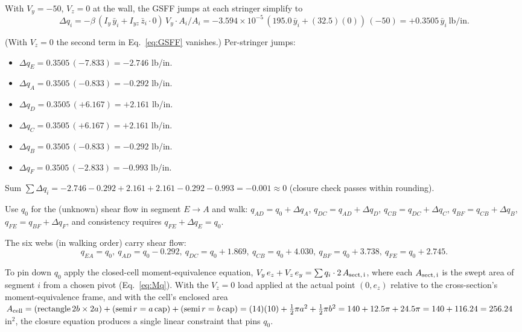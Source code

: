 \documentclass[11pt]{article}
\begin{document}
With $V_y = -50$, $V_z = 0$ at the wall, the GSFF jumps at each stringer simplify to
$$\Delta q_i = -\beta\,(I_y\,\bar y_i + I_{yz}\,\bar z_i \cdot 0)\,V_y\cdot A_i / A_i = -3.594\times 10^{-5}\,(195.0\,\bar y_i + (32.5)(0))\,(-50) = +0.3505\,\bar y_i\ \text{lb/in}.$$

(With $V_z = 0$ the second term in Eq.~\eqref{eq:GSFF} vanishes.) Per-stringer jumps:
\begin{itemize}[leftmargin=2em, itemsep=0pt]
  \item $\Delta q_E = 0.3505\,(-7.833) = -2.746$ lb/in.
  \item $\Delta q_A = 0.3505\,(-0.833) = -0.292$ lb/in.
  \item $\Delta q_D = 0.3505\,(+6.167) = +2.161$ lb/in.
  \item $\Delta q_C = 0.3505\,(+6.167) = +2.161$ lb/in.
  \item $\Delta q_B = 0.3505\,(-0.833) = -0.292$ lb/in.
  \item $\Delta q_F = 0.3505\,(-2.833) = -0.993$ lb/in.
\end{itemize}
Sum $\sum \Delta q_i = -2.746 - 0.292 + 2.161 + 2.161 - 0.292 - 0.993 = -0.001 \approx 0$ (closure check passes within rounding).

Use $q_0$ for the (unknown) shear flow in segment $E \to A$ and walk: $q_{AD} = q_0 + \Delta q_A$, $q_{DC} = q_{AD} + \Delta q_D$, $q_{CB} = q_{DC} + \Delta q_C$, $q_{BF} = q_{CB} + \Delta q_B$, $q_{FE} = q_{BF} + \Delta q_F$, and consistency requires $q_{FE} + \Delta q_E = q_0$.

The six webs (in walking order) carry shear flow:
$$q_{EA} = q_0,\ q_{AD} = q_0 - 0.292,\ q_{DC} = q_0 + 1.869,\ q_{CB} = q_0 + 4.030,\ q_{BF} = q_0 + 3.738,\ q_{FE} = q_0 + 2.745.$$

To pin down $q_0$ apply the closed-cell moment-equivalence equation, $V_y\,e_z + V_z\,e_y = \sum q_i \cdot 2\,A_{\rm sect,\,i}$, where each $A_{\rm sect,\,i}$ is the swept area of segment $i$ from a chosen pivot (Eq.~\eqref{eq:Mq}). With the $V_z = 0$ load applied at the actual point $(0, e_z)$ relative to the cross-section's moment-equivalence frame, and with the cell's enclosed area $A_{\rm cell} = (\text{rectangle}\,2b\times 2a) + (\text{semi}\,r=a\,\text{cap}) + (\text{semi}\,r=b\,\text{cap}) = (14)(10) + \tfrac{1}{2}\pi a^2 + \tfrac{1}{2}\pi b^2 = 140 + 12.5\pi + 24.5\pi = 140 + 116.24 = 256.24$ in$^2$, the closure equation produces a single linear constraint that pins $q_0$.
\end{document}
